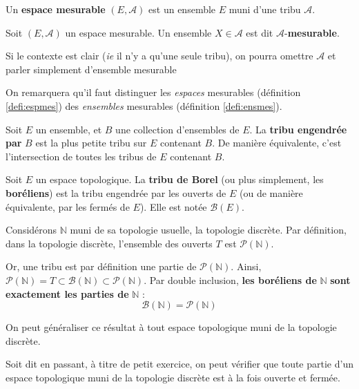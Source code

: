 \documentclass[../integ-proba.tex]{subfiles}
\begin{document}
\begin{defi}
  \label{defi:espmes}
  Un \textbf{espace mesurable} $\left(E, \mathcal{A}\right)$ est un ensemble $E$ muni d'une tribu $\mathcal{A}$.
\end{defi}

\begin{defi}
  \label{defi:ensmes}
  Soit $\left(E, \mathcal{A}\right)$ un espace mesurable. Un ensemble $X\in \mathcal{A}$ est dit $\mathcal{A}$-\textbf{mesurable}.
\end{defi}

\begin{rem}
  Si le contexte est clair (\textit{ie} il n'y a qu'une seule tribu), on pourra omettre $\mathcal{A}$ et parler simplement d'ensemble mesurable
\end{rem}

\begin{rem}
  On remarquera qu'il faut distinguer les \textit{espaces} mesurables (définition \ref{defi:espmes}) des \textit{ensembles} mesurables (définition \ref{defi:ensmes}).
\end{rem}

\begin{defi}
  Soit $E$ un ensemble, et $B$ une collection d'ensembles de $E$.
  La \textbf{tribu engendrée par} $B$ est la plus petite tribu sur $E$ contenant $B$.
  De manière équivalente, c'est l'intersection de toutes les tribus de $E$ contenant $B$.
\end{defi}

\begin{defi}
  \label{defi:Borel}
  Soit $E$ un espace topologique.
  La \textbf{tribu de Borel} (ou plus simplement, les \textbf{boréliens}) est la tribu engendrée par les ouverts de $E$ (ou de manière équivalente, par les fermés de $E$).
  Elle est notée $\mathcal{B}(E)$.
\end{defi}

\begin{exemple}
  \label{exemple:boreliens_et_topologie_discrete}
  Considérons $\mathbb{N}$ muni de sa topologie usuelle, la topologie discrète.
  Par définition, dans la topologie discrète, l'ensemble des ouverts $T$ est $\mathcal{P}(\mathbb{N})$.

  Or, une tribu est par définition une partie de $\mathcal{P}(\mathbb{N})$.
  Ainsi, $\mathcal{P}(\mathbb{N}) = T \subset \mathcal{B}(\mathbb{N}) \subset \mathcal{P}(\mathbb{N})$.
  Par double inclusion, \textbf{les boréliens de} $\mathbb{N}$ \textbf{sont exactement les parties de} $\mathbb{N}$ :
  $$
  \mathcal{B}(\mathbb{N}) = \mathcal{P}(\mathbb{N})
  $$

  On peut généraliser ce résultat à tout espace topologique muni de la topologie discrète.

  Soit dit en passant, à titre de petit exercice, on peut vérifier que toute partie d'un espace topologique muni de la topologie discrète est à la fois ouverte et fermée.
\end{exemple}
\end{document}
